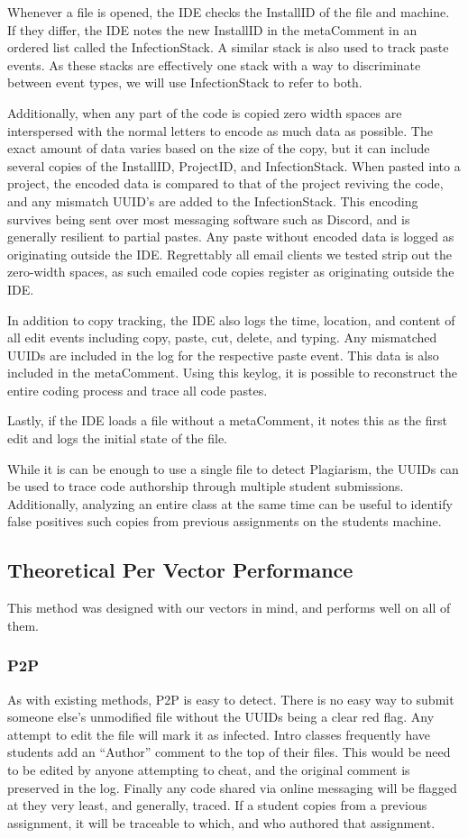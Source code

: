 \documentclass[letterpaper,10pt,conference]{IEEEtran}
\newcommand{\installID}{InstallID\xspace}
\newcommand{\projectID}{ProjectID\xspace}
\newcommand{\metaComment}{metaComment\xspace}
\newcommand{\infectionStack}{InfectionStack\xspace}
\begin{document}
Whenever a file is opened, the IDE checks the \installID of the file and machine.  If they differ, the IDE notes the new \installID in the \metaComment in an ordered list called the \infectionStack.  A similar stack is also used to track paste events.  As these stacks are effectively one stack with a way to discriminate between event types, we will use \infectionStack to refer to both.

Additionally, when any part of the code is copied zero width spaces are interspersed with the normal letters to encode as much data as possible.  The exact amount of data varies based on the size of the copy, but it can include several copies of the \installID, \projectID, and \infectionStack.  When pasted into a project, the encoded data is compared to that of the project reviving the code, and any mismatch UUID's are added to the \infectionStack. This encoding survives being sent over most messaging software such as Discord, and is generally resilient to partial pastes.  Any paste without encoded data is logged as originating outside the IDE.   Regrettably all email clients we tested strip out the zero-width spaces, as such emailed code copies register as originating outside the IDE. 

In addition to copy tracking, the IDE also logs the time, location, and content of all edit events including copy, paste, cut, delete, and typing.  Any mismatched UUIDs are included in the log for the respective paste event.  This data is also included in the \metaComment.  Using this keylog, it is possible to reconstruct the entire coding process and trace all code pastes.

Lastly, if the IDE loads a file without a \metaComment, it notes this as the first edit and logs the initial state of the file.

While it is can be enough to use a single file to detect Plagiarism, the UUIDs can be used to trace code authorship through multiple student submissions.  Additionally, analyzing an entire class at the same time can be useful to identify false positives such copies from previous assignments on the students machine.

\subsection{Theoretical Per Vector Performance}
This method was designed with our vectors in mind, and performs well on all of them.
\subsubsection{P2P}
		As with existing methods, P2P is easy to detect.  There is no easy way to submit someone else's unmodified file without the UUIDs being a clear red flag.  Any attempt to edit the file will mark it as infected.  Intro classes frequently have students add an ``Author'' comment to the top of their files.  This would be need to be edited by anyone attempting to cheat, and the original comment is preserved in the log. Finally any code shared via online messaging will be flagged at they very least, and generally, traced.   If a student copies from a previous assignment, it will be traceable to  which, and who authored that assignment.
		
\end{document}

